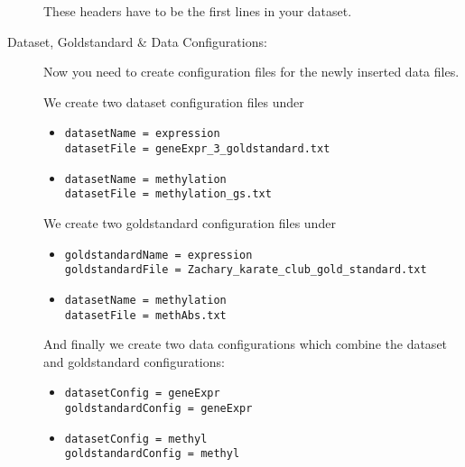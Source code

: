 \begin{description}
	These headers have to be the first lines in your dataset.
	
	\item[Dataset, Goldstandard \& Data Configurations:] Now you need to create configuration files for the newly inserted data files.
	
	We create two dataset configuration files under 
	\begin{itemize}
		\item {}
		\begin{lstlisting}
datasetName = expression
datasetFile = geneExpr_3_goldstandard.txt
		\end{lstlisting}
		\item {}
		\begin{lstlisting}
datasetName = methylation
datasetFile = methylation_gs.txt
		\end{lstlisting}
	\end{itemize}
	
	We create two goldstandard configuration files under 
	\begin{itemize}
		\item {}
		\begin{lstlisting}
goldstandardName = expression
goldstandardFile = Zachary_karate_club_gold_standard.txt
		\end{lstlisting}
		\item {}
		\begin{lstlisting}
datasetName = methylation
datasetFile = methAbs.txt
		\end{lstlisting}
	\end{itemize}
	
	And finally we create two data configurations which combine the dataset and goldstandard configurations:
	\begin{itemize}
		\item {}
		\begin{lstlisting}
datasetConfig = geneExpr
goldstandardConfig = geneExpr
		\end{lstlisting}
		\item {}
		\begin{lstlisting}
datasetConfig = methyl
goldstandardConfig = methyl
		\end{lstlisting}
	\end{itemize}
	

\end{description}
